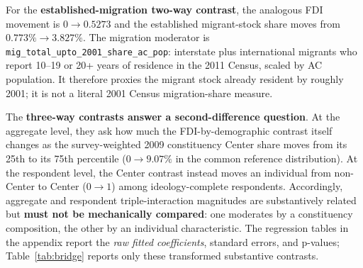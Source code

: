 \documentclass[11pt]{article}
\begin{document}
For the \textbf{established-migration two-way contrast}, the analogous FDI movement is $0\rightarrow0.5273$ and the established migrant-stock share moves from $0.773\%\rightarrow3.827\%$. The migration moderator is \texttt{mig\_total\_upto\_2001\_share\_ac\_pop}: interstate plus international migrants who report 10--19 or 20+ years of residence in the 2011 Census, scaled by AC population. It therefore proxies the migrant stock already resident by roughly 2001; it is not a literal 2001 Census migration-share measure.

The \textbf{three-way contrasts answer a second-difference question}. At the aggregate level, they ask how much the FDI-by-demographic contrast itself changes as the survey-weighted 2009 constituency Center share moves from its 25th to its 75th percentile ($0\rightarrow9.07\%$ in the common reference distribution). At the respondent level, the Center contrast instead moves an individual from non-Center to Center ($0\rightarrow1$) among ideology-complete respondents. Accordingly, aggregate and respondent triple-interaction magnitudes are substantively related but \textbf{must not be mechanically compared}: one moderates by a constituency composition, the other by an individual characteristic. The regression tables in the appendix report the \emph{raw fitted coefficients}, standard errors, and p-values; Table~\ref{tab:bridge} reports only these transformed substantive contrasts.
\end{document}

